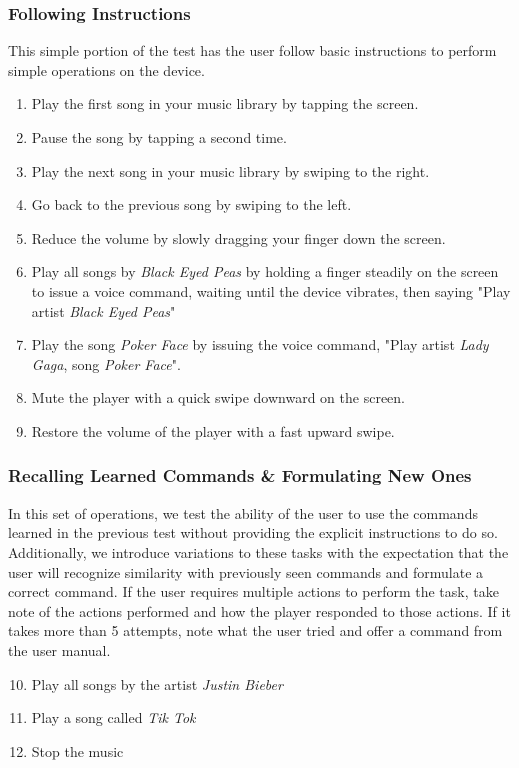 \documentclass[12pt,letterpaper]{article}
\begin{document}
\subsubsection{Following Instructions}
This simple portion of the test has the user follow basic instructions to perform simple operations on the device. \begin{enumerate}
\item Play the first song in your music library by tapping the screen.
\item Pause the song by tapping a second time.
\item Play the next song in your music library by swiping to the right.
\item Go back to the previous song by swiping to the left.
\item Reduce the volume by slowly dragging your finger down the screen.
\item Play all songs by \textit{Black Eyed Peas} by holding a finger steadily on the screen to issue a voice command, waiting until the device vibrates, then saying "Play artist \textit{Black Eyed Peas}"
\item Play the song \textit{Poker Face} by issuing the voice command, "Play artist \textit{Lady Gaga}, song \textit{Poker Face}".
\item Mute the player with a quick swipe downward on the screen.
\item Restore the volume of the player with a fast upward swipe.
\end{enumerate}

\subsubsection{Recalling Learned Commands \& Formulating New Ones}
In this set of operations, we test the ability of the user to use the commands learned in the previous test without providing the explicit instructions to do so. Additionally, we introduce variations to these tasks with the expectation that the user will recognize similarity with previously seen commands and formulate a correct command. If the user requires multiple actions to perform the task, take note of the actions performed and how the player responded to those actions. If it takes more than 5 attempts, note what the user tried and offer a command from the user manual.
\begin{enumerate}
\setcounter{enumi}{9}
\item Play all songs by the artist \textit{Justin Bieber}
\item Play a song called \textit{Tik Tok}
\item Stop the music
\end{enumerate}
\end{document}

